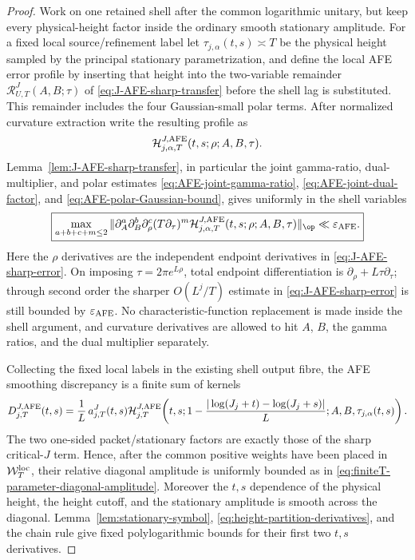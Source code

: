 \begin{proof}
Work on one retained shell after the common logarithmic unitary, but keep every
physical-height factor inside the ordinary smooth stationary amplitude.  For a
fixed local source/refinement label let
$\tau_{j,\alpha}(t,s)\asymp T$ be the physical height sampled by the principal
stationary parametrization, and define the local AFE error profile by inserting
that height into the two-variable remainder
$\mathcal R^J_{U,T}(A,B;\tau)$ of
\eqref{eq:J-AFE-sharp-transfer} before the shell lag is substituted.  This
remainder includes the four Gaussian-small polar terms.  After normalized
curvature extraction write the resulting profile as
\[
\mathcal H^{J,\rm AFE}_{j,\alpha,T}(t,s;\rho;A,B,\tau).
\]
Lemma~\ref{lem:J-AFE-sharp-transfer}, in particular the joint gamma-ratio,
dual-multiplier, and polar estimates
\eqref{eq:AFE-joint-gamma-ratio}, \eqref{eq:AFE-joint-dual-factor}, and
\eqref{eq:AFE-polar-Gaussian-bound}, gives uniformly in the shell variables
\begin{equation}
\boxed{
\max_{a+b+c+m\le2}
\|\partial_A^a\partial_B^b\partial_\rho^c(T\partial_\tau)^m
 \mathcal H^{J,\rm AFE}_{j,\alpha,T}
 (t,s;\rho;A,B,\tau)\|_{\op}
\ll\varepsilon_{\rm AFE}.
}
\label{eq:J-AFE-local-profile-small}
\end{equation}
Here the $\rho$ derivatives are the independent endpoint derivatives in
\eqref{eq:J-AFE-sharp-error}.  On imposing
$\tau=2\pi e^{L\rho}$, total endpoint differentiation is
$\partial_\rho+L\tau\partial_\tau$; through second order the sharper
$O(L^j/T)$ estimate in \eqref{eq:J-AFE-sharp-error} is still bounded by
$\varepsilon_{\rm AFE}$.  No characteristic-function replacement is made
inside the shell argument, and curvature derivatives are allowed to hit
$A$, $B$, the gamma ratios, and the dual multiplier separately.

Collecting the fixed local labels in the existing shell output fibre, the AFE
smoothing discrepancy is a finite sum of kernels
\begin{equation}
D^{J,\rm AFE}_{j,T}(t,s)
=\frac1L\,a^J_{j,T}(t,s)
 \mathcal H^{J,\rm AFE}_{j,T}\!\left(t,s;
 1-\frac{|\log(J_j+t)-\log(J_j+s)|}{L};
 A,B,\tau_{j,\alpha}(t,s)\right).
\label{eq:J-AFE-shell-kernel}
\end{equation}
The two one-sided packet/stationary factors are exactly those of the sharp
critical-$J$ term.  Hence, after the common positive weights have been placed in
$\mathcal W_T^{\rm loc}$, their relative diagonal amplitude is uniformly
bounded as in \eqref{eq:finiteT-parameter-diagonal-amplitude}.  Moreover the
$t,s$ dependence of the physical height, the height cutoff, and the stationary
amplitude is smooth across the diagonal.  Lemma~\ref{lem:stationary-symbol},
\eqref{eq:height-partition-derivatives}, and the chain rule give fixed
polylogarithmic bounds for their first two $t,s$ derivatives.


\end{proof}
